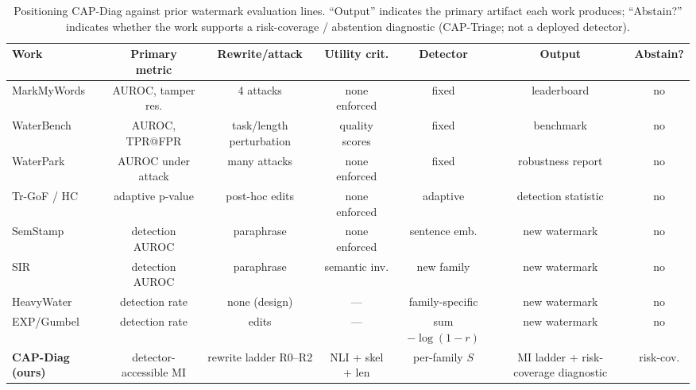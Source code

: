 \begin{table}[t]
\centering
\small
\caption{Positioning CAP-Diag against prior watermark evaluation lines.
``Output'' indicates the primary artifact each work produces;
``Abstain?'' indicates whether the work supports a risk-coverage /
abstention diagnostic (CAP-Triage; not a deployed detector).}
\label{tab:related}
\setlength{\tabcolsep}{4pt}
\begin{tabular}{l c c c c c c}
\toprule
Work & Primary metric & Rewrite/attack & Utility crit. & Detector & Output & Abstain? \\
\midrule
MarkMyWords~\citep{piet2024markmywords} & AUROC, tamper res. & 4 attacks & none enforced & fixed & leaderboard & no \\
WaterBench~\citep{tu2024waterbench}     & AUROC, TPR@FPR & task/length perturbation & quality scores & fixed & benchmark & no \\
WaterPark~\citep{liang2024waterpark}     & AUROC under attack & many attacks & none enforced & fixed & robustness report & no \\
Tr-GoF / HC~\citep{li2024trgof}          & adaptive p-value & post-hoc edits & none enforced & adaptive & detection statistic & no \\
SemStamp~\citep{hou2024semstamp}         & detection AUROC & paraphrase & none enforced & sentence emb. & new watermark & no \\
SIR~\citep{liu2024semantic}              & detection AUROC & paraphrase & semantic inv. & new family & new watermark & no \\
HeavyWater~\citep{tsur2025heavywater}    & detection rate & none (design) & — & family-specific & new watermark & no \\
EXP/Gumbel~\citep{kuditipudi2024robust} & detection rate & edits & — & sum $-\log(1-r)$ & new watermark & no \\
\midrule
\textbf{CAP-Diag (ours)} & detector-accessible MI & rewrite ladder R0--R2 & NLI + skel + len & per-family $S$ & MI ladder + risk-coverage diagnostic & risk-cov. \\
\bottomrule
\end{tabular}
\end{table}
